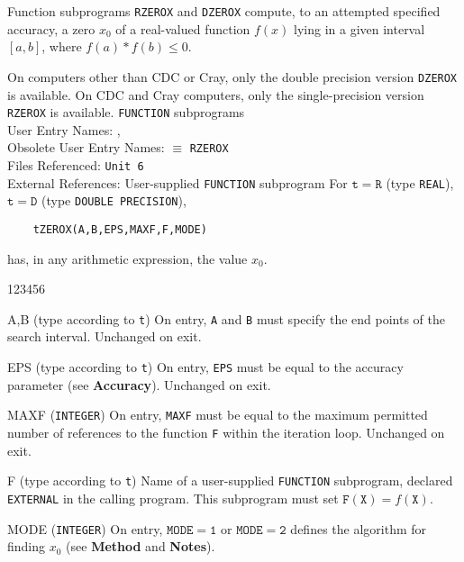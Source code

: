                                 
                         
\Submitter{}                                  
                             
Function subprograms {\tt RZEROX} and {\tt DZEROX} compute, to an
attempted  specified accuracy, a zero $ x_0 $ of a real-valued
function $f(x)$ lying in a given interval $[a,b]$,
where $f(a)*f(b)\le 0 $.
\par
On computers other than  CDC or Cray, only the double precision
version {\tt DZEROX} is  available.
On CDC and Cray computers, only the single-precision version
{\tt RZEROX} is available.
\Structure
{\tt FUNCTION} subprograms \\
User Entry Names: ,  \\
Obsolete User Entry Names:  $\equiv$ {\tt RZEROX} \\
Files Referenced:  {\tt Unit 6} \\
External References: User-supplied {\tt FUNCTION} subprogram
\Usage
For $\mathtt{t=R}$ (type {\tt REAL}), $\mathtt{t=D}$ (type
{\tt DOUBLE PRECISION}),
\begin{verbatim}
    tZEROX(A,B,EPS,MAXF,F,MODE)
\end{verbatim}
has, in any arithmetic expression, the value $x_0$.
\begin{DLtt}{123456}
\item[A,B] (type according to {\tt t}) On entry, {\tt A} and {\tt B}
must specify the end points of the search interval. Unchanged on exit.
\item[EPS] (type according to {\tt t})
On entry, {\tt EPS} must be equal  to the accuracy  parameter
(see {\bf Accuracy}). Unchanged   on  exit.
\item[MAXF] ({\tt INTEGER})
On entry, {\tt MAXF} must be equal to the maximum  permitted
number of references  to the function {\tt F} within the iteration loop.
Unchanged on exit.
\item[F] (type according to {\tt t}) Name of a user-supplied
{\tt FUNCTION} subprogram, declared {\tt EXTERNAL} in the calling
program. This subprogram  must set $\mathtt{F(X)} = f(\mathtt{X})$.
\item[MODE] ({\tt INTEGER})
On entry, $\mathtt{MODE=1}$ or $\mathtt{MODE=2}$ defines the
algorithm for finding $x_0$ (see {\bf Method} and {\bf Notes}).
\end{DLtt}
